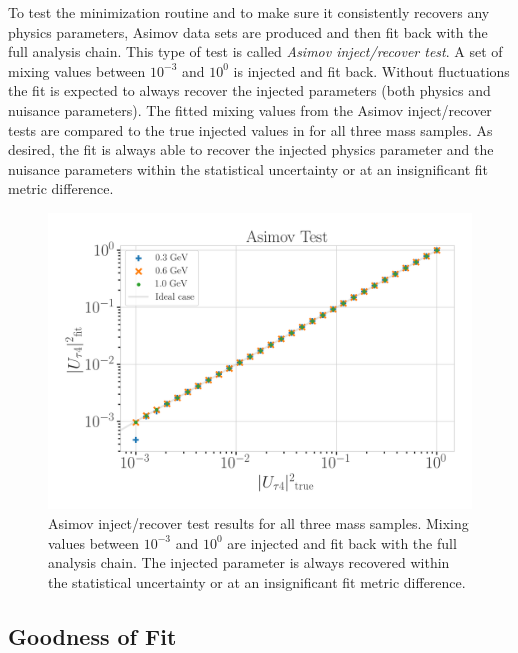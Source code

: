 To test the minimization routine and to make sure it consistently recovers any physics parameters, Asimov data sets are produced  and then fit back with the full analysis chain. This type of test is called \textit{Asimov inject/recover test}. A set of mixing values between $10^{-3}$ and $10^{0}$ is injected and fit back. Without fluctuations the fit is expected to always recover the injected parameters (both physics and nuisance parameters). The fitted mixing values from the Asimov inject/recover tests are compared to the true injected values in  for all three mass samples. As desired, the fit is always able to recover the injected physics parameter and the nuisance parameters within the statistical uncertainty or at an insignificant fit metric difference. 

\begin{figure}[h]
    \includegraphics{figures/results/checks/asimov_tests_combined.png}
	\caption[Asimov inject/recover test]{Asimov inject/recover test results for all three mass samples. Mixing values between $10^{-3}$ and $10^{0}$ are injected and fit back with the full analysis chain. The injected parameter is always recovered within the statistical uncertainty or at an insignificant fit metric difference.}
\end{figure}


\subsection{Goodness of Fit} 

